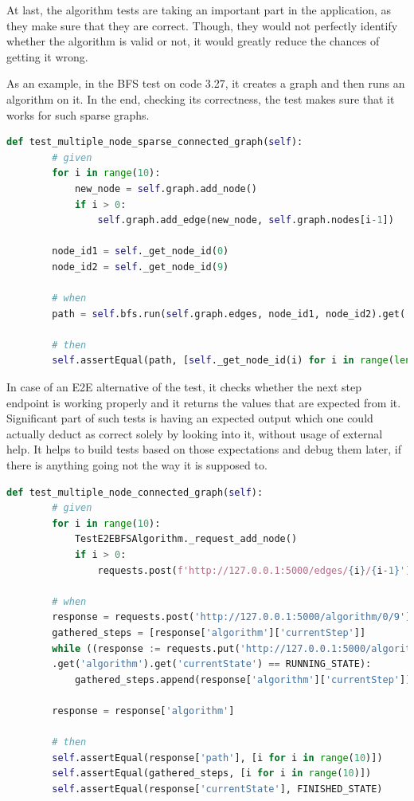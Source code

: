 At last, the algorithm tests are taking an important part in the application, as they make sure that they are correct. Though, they would not perfectly identify whether the algorithm is valid or not, it would greatly reduce the chances of getting it wrong.

As an example, in the BFS test on code 3.27, it creates a graph and then runs an algorithm on it. In the end, checking its correctness, the test makes sure that it works for such sparse graphs.

\begin{lstlisting}[language={python}]
    def test_multiple_node_sparse_connected_graph(self):
		# given
		for i in range(10):
			new_node = self.graph.add_node()
			if i > 0:
				self.graph.add_edge(new_node, self.graph.nodes[i-1])
		
		node_id1 = self._get_node_id(0)
		node_id2 = self._get_node_id(9)
		
		# when
		path = self.bfs.run(self.graph.edges, node_id1, node_id2).get('path')
		
		# then
		self.assertEqual(path, [self._get_node_id(i) for i in range(len(self.graph.nodes))])
\end{lstlisting}

In case of an E2E alternative of the test, it checks whether the next step endpoint is working properly and it returns the values that are expected from it. Significant part of such tests is having an expected output which one could actually deduct as correct solely by looking into it, without usage of external help. It helps to build tests based on those expectations and debug them later, if there is anything going not the way it is supposed to.

\begin{lstlisting}[language={python}]
    def test_multiple_node_connected_graph(self):
		# given
		for i in range(10):
			TestE2EBFSAlgorithm._request_add_node()
			if i > 0:
				requests.post(f'http://127.0.0.1:5000/edges/{i}/{i-1}')
		
		# when
		response = requests.post('http://127.0.0.1:5000/algorithm/0/9').json()
		gathered_steps = [response['algorithm']['currentStep']]
		while ((response := requests.put('http://127.0.0.1:5000/algorithm/next_step').json())
		.get('algorithm').get('currentState') == RUNNING_STATE):
			gathered_steps.append(response['algorithm']['currentStep'])
		
		response = response['algorithm']
		
		# then
		self.assertEqual(response['path'], [i for i in range(10)])
		self.assertEqual(gathered_steps, [i for i in range(10)])
		self.assertEqual(response['currentState'], FINISHED_STATE)
\end{lstlisting}


